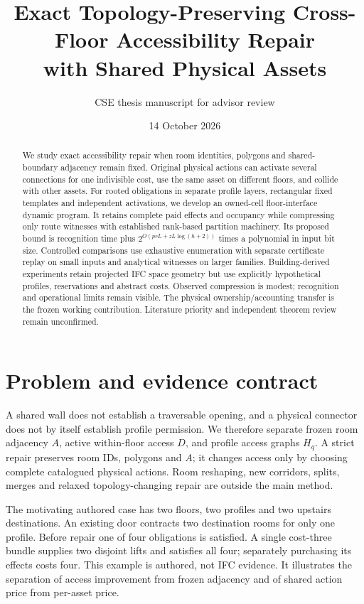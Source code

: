 \documentclass[10pt]{article}
\title{Exact Topology-Preserving Cross-Floor Accessibility Repair\\with Shared Physical Assets}
\author{CSE thesis manuscript for advisor review}
\date{14 October 2026}
\begin{document}
\maketitle
\begin{abstract}
We study exact accessibility repair when room identities, polygons and shared-boundary adjacency remain fixed. Original physical actions can activate several connections for one indivisible cost, use the same asset on different floors, and collide with other assets. For rooted obligations in separate profile layers, rectangular fixed templates and independent activations, we develop an owned-cell floor-interface dynamic program. It retains complete paid effects and occupancy while compressing only route witnesses with established rank-based partition machinery. Its proposed bound is recognition time plus $2^{O(prL+zL\log(h+2))}$ times a polynomial in input bit size. Controlled comparisons use exhaustive enumeration with separate certificate replay on small inputs and analytical witnesses on larger families. Building-derived experiments retain projected IFC space geometry but use explicitly hypothetical profiles, reservations and abstract costs. Observed compression is modest; recognition and operational limits remain visible. The physical ownership/accounting transfer is the frozen working contribution. Literature priority and independent theorem review remain unconfirmed.
\end{abstract}

\section{Problem and evidence contract}
A shared wall does not establish a traversable opening, and a physical connector does not by itself establish profile permission. We therefore separate frozen room adjacency $A$, active within-floor access $D$, and profile access graphs $H_q$. A strict repair preserves room IDs, polygons and $A$; it changes access only by choosing complete catalogued physical actions. Room reshaping, new corridors, splits, merges and relaxed topology-changing repair are outside the main method.

The motivating authored case has two floors, two profiles and two upstairs destinations. An existing door contracts two destination rooms for only one profile. Before repair one of four obligations is satisfied. A single cost-three bundle supplies two disjoint lifts and satisfies all four; separately purchasing its effects costs four. This example is authored, not IFC evidence. It illustrates the separation of access improvement from frozen adjacency and of shared action price from per-asset price.
\end{document}
